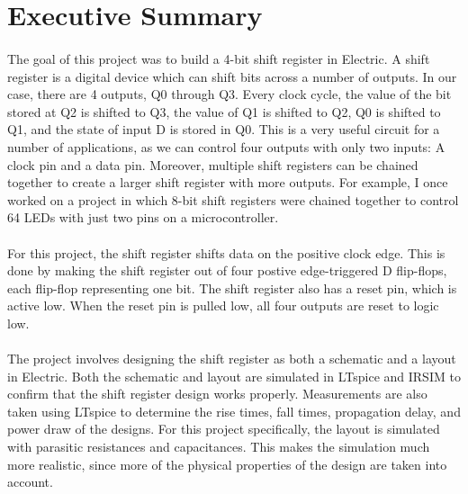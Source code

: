 \documentclass{article}
\begin{document}



\tableofcontents

\newpage
{}

\section{Executive Summary}
  \paragraph{}
  The goal of this project was to build a 4-bit shift register in Electric. A shift register is a digital device which can shift bits across a number of outputs. In our case, there are 4 outputs, Q0 through Q3. Every clock cycle, the value of the bit stored at Q2 is shifted to Q3, the value of Q1 is shifted to Q2, Q0 is shifted to Q1, and the state of input D is stored in Q0. This is a very useful circuit for a number of applications, as we can control four outputs with only two inputs: A clock pin and a data pin. Moreover, multiple shift registers can be chained together to create a larger shift register with more outputs. For example, I once worked on a project in which 8-bit shift registers were chained together to control 64 LEDs with just two pins on a microcontroller.

  \paragraph{}
  For this project, the shift register shifts data on the positive clock edge. This is done by making the shift register out of four postive edge-triggered D flip-flops, each flip-flop representing one bit. The shift register also has a reset pin, which is active low. When the reset pin is pulled low, all four outputs are reset to logic low.

  \paragraph{}
  The project involves designing the shift register as both a schematic and a layout in Electric. Both the schematic and layout are simulated in LTspice and IRSIM to confirm that the shift register design works properly. Measurements are also taken using LTspice to determine the rise times, fall times, propagation delay, and power draw of the designs. For this project specifically, the layout is simulated with parasitic resistances and capacitances. This makes the simulation much more realistic, since more of the physical properties of the design are taken into account.
\end{document}
